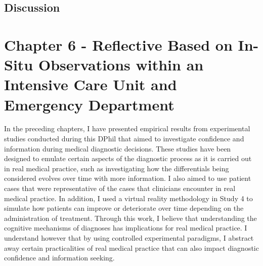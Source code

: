 \documentclass[a4paper, nobind]{templates/ociamthesis}
\begin{document}
\section{Discussion}\label{discussion-3}

\chapter{Chapter 6 - Reflective Based on In-Situ Observations within an Intensive Care Unit and Emergency Department}\label{chapter-6}

\adjustmtc
{}

In the preceding chapters, I have presented empirical results from experimental studies conducted during this DPhil that aimed to investigate confidence and information during medical diagnostic decisions. These studies have been designed to emulate certain aspects of the diagnostic process as it is carried out in real medical practice, such as investigating how the differentials being considered evolves over time with more information. I also aimed to use patient cases that were representative of the cases that clinicians encounter in real medical practice. In addition, I used a virtual reality methodology in Study 4 to simulate how patients can improve or deteriorate over time depending on the administration of treatment. Through this work, I believe that understanding the cognitive mechanisms of diagnoses has implications for real medical practice. I understand however that by using controlled experimental paradigms, I abstract away certain practicalities of real medical practice that can also impact diagnostic confidence and information seeking.
\end{document}
